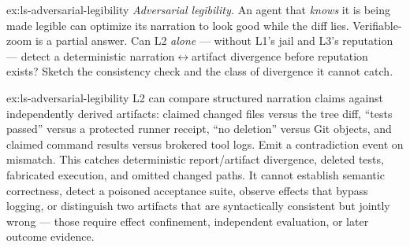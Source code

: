 \documentclass[11pt,a4paper]{article}
\theoremstyle{definition}
\theoremstyle{plain}
\begin{document}
\begin{pdexercise}[kind=Open,rating=3]{ex:ls-adversarial-legibility}
\emph{Adversarial legibility.} An agent that \emph{knows} it
is being made legible can optimize its narration to look good while the diff lies.
Verifiable-zoom is a partial answer. Can L2 \emph{alone} --- without L1's jail and
L3's reputation --- detect a deterministic narration$\leftrightarrow$artifact
divergence before reputation exists? Sketch the consistency check and the class of
divergence it cannot catch.
\end{pdexercise}
\begin{pdsolution}{ex:ls-adversarial-legibility}
L2 can compare structured narration claims against independently derived artifacts: claimed changed files versus the tree diff, ``tests passed'' versus a protected runner receipt, ``no deletion'' versus Git objects, and claimed command results versus brokered tool logs. Emit a contradiction event on mismatch. This catches deterministic report/artifact divergence, deleted tests, fabricated execution, and omitted changed paths. It cannot establish semantic correctness, detect a poisoned acceptance suite, observe effects that bypass logging, or distinguish two artifacts that are syntactically consistent but jointly wrong --- those require effect confinement, independent evaluation, or later outcome evidence.
\end{pdsolution}

\end{document}
